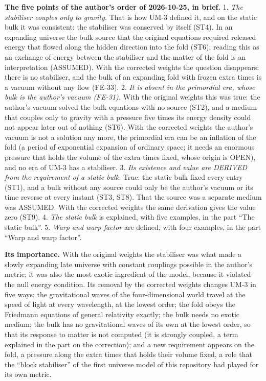 \documentclass[
  10pt,
]{article}
\begin{document}
\textbf{The five points of the author's order of 2026-10-25, in brief.}
1. \emph{The stabiliser couples only to gravity.} That is how UM-3
defined it, and on the static bulk it was consistent: the stabiliser was
conserved by itself (ST4). In an expanding universe the bulk source that
the original equations required released energy that flowed along the
hidden direction into the fold (ST6); reading this as an exchange of
energy between the stabiliser and the matter of the fold is an
interpretation (ASSUMED). With the corrected weights the question
disappears: there is no stabiliser, and the bulk of an expanding fold
with frozen extra times is a vacuum without any flow (FE-33). 2.
\emph{It is absent in the primordial era, whose bulk is the author's
vacuum (FE-31).} With the original weights this was true: the author's
vacuum solved the bulk equations with no source (ST2), and a medium that
couples only to gravity with a pressure five times its energy density
could not appear later out of nothing (ST6). With the corrected weights
the author's vacuum is not a solution any more, the primordial era can
be an inflation of the fold (a period of exponential expansion of
ordinary space; it needs an enormous pressure that holds the volume of
the extra times fixed, whose origin is OPEN), and no era of UM-3 has a
stabiliser. 3. \emph{Its existence and value are DERIVED from the
requirement of a static bulk.} True: the static bulk fixed every entry
(ST1), and a bulk without any source could only be the author's vacuum
or its time reverse at every instant (ST3, ST8). That the source was a
separate medium was ASSUMED. With the corrected weights the same
derivation gives the value zero (ST9). 4. \emph{The static bulk} is
explained, with five examples, in the part ``The static bulk''. 5.
\emph{Warp and warp factor} are defined, with four examples, in the part
``Warp and warp factor''.

\textbf{Its importance.} With the original weights the stabiliser was
what made a slowly expanding late universe with constant couplings
possible in the author's metric; it was also the most exotic ingredient
of the model, because it violated the null energy condition. Its removal
by the corrected weights changes UM-3 in five ways: the gravitational
waves of the four-dimensional world travel at the speed of light at
every wavelength, at the lowest order; the fold obeys the Friedmann
equations of general relativity exactly; the bulk needs no exotic
medium; the bulk has no gravitational waves of its own at the lowest
order, so that its response to matter is not computed (it is strongly
coupled, a term explained in the part on the correction); and a new
requirement appears on the fold, a pressure along the extra times that
holds their volume fixed, a role that the ``block stabiliser'' of the
first universe model of this repository had played for its own metric.
\end{document}
